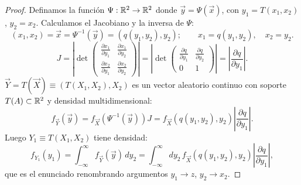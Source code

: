 \begin{proof}
Definamos la función $\Psi : \mathbb{R}^2 \to \mathbb{R}^2$ donde $\vec{y} = \Psi(\vec{x})$, con $y_1 = T(x_1, x_2)$, $y_2 = x_2$. Calculamos el Jacobiano y la inversa de $\Psi$:
\[
  (x_1, x_2) = \vec{x} = \Psi^{-1}(\vec{y}) = (q(y_1, y_2), y_2); \qquad x_1 = q(y_1, y_2), \quad x_2 = y_2.
\]
\[
  J = \left|\det \begin{pmatrix} \frac{\partial x_1}{\partial y_1} & \frac{\partial x_1}{\partial y_2} \\ \frac{\partial x_2}{\partial y_1} & \frac{\partial x_2}{\partial y_2} \end{pmatrix}\right| = \left|\det \begin{pmatrix} \frac{\partial q}{\partial y_1} & \frac{\partial q}{\partial y_2} \\ 0 & 1 \end{pmatrix}\right| = \left|\frac{\partial q}{\partial y_1}\right|.
\]
$\vec{Y} = T(\vec{X}) \equiv (T(X_1, X_2), X_2)$ es un vector aleatorio continuo con soporte $T(A) \subset \mathbb{R}^2$ y densidad multidimensional:
\[
  f_{\vec{Y}}(\vec{y}) = f_{\vec{X}}(\Psi^{-1}(\vec{y})) J = f_{\vec{X}}(q(y_1, y_2), y_2) \left|\frac{\partial q}{\partial y_1}\right|.
\]
Luego $Y_1 \equiv T(X_1, X_2)$ tiene densidad:
\[
  f_{Y_1}(y_1) = \int_{-\infty}^\infty f_{\vec{Y}}(\vec{y})\,dy_2 = \int_{-\infty}^\infty dy_2 \, f_{\vec{X}}(q(y_1, y_2), y_2) \left|\frac{\partial q}{\partial y_1}\right|,
\]
que es el enunciado renombrando argumentos $y_1 \to z$, $y_2 \to x_2$.
\end{proof}
